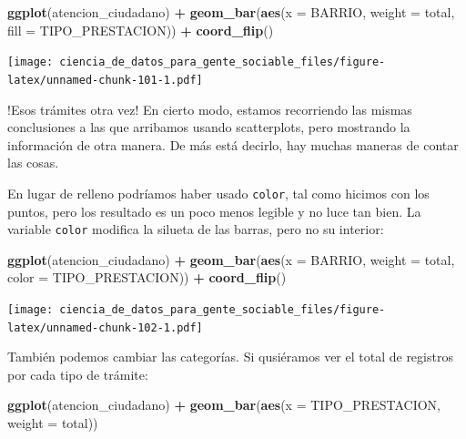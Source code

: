 \documentclass[spanish,]{book}
\newenvironment{Shaded}{\begin{snugshade}}{\end{snugshade}}
\newcommand{\DataTypeTok}[1]{\textcolor[rgb]{0.13,0.29,0.53}{#1}}
\newcommand{\KeywordTok}[1]{\textcolor[rgb]{0.13,0.29,0.53}{\textbf{#1}}}
\newcommand{\NormalTok}[1]{#1}
\newcommand{\OperatorTok}[1]{\textcolor[rgb]{0.81,0.36,0.00}{\textbf{#1}}}
\newcommand{\StringTok}[1]{\textcolor[rgb]{0.31,0.60,0.02}{#1}}
\begin{document}
\begin{Shaded}
\begin{Highlighting}[]
\KeywordTok{ggplot}\NormalTok{(atencion_ciudadano) }\OperatorTok{+}
\StringTok{    }\KeywordTok{geom_bar}\NormalTok{(}\KeywordTok{aes}\NormalTok{(}\DataTypeTok{x =}\NormalTok{ BARRIO, }\DataTypeTok{weight =}\NormalTok{ total, }\DataTypeTok{fill =}\NormalTok{ TIPO_PRESTACION)) }\OperatorTok{+}
\StringTok{    }\KeywordTok{coord_flip}\NormalTok{()}
\end{Highlighting}
\end{Shaded}

\texttt{[image: ciencia\_de\_datos\_para\_gente\_sociable\_files/figure-latex/unnamed-chunk-101-1.pdf]}

!Esos trámites otra vez! En cierto modo, estamos recorriendo las mismas conclusiones a las que arribamos usando scatterplots, pero mostrando la información de otra manera. De más está decirlo, hay muchas maneras de contar las cosas.

En lugar de relleno podríamos haber usado \texttt{color}, tal como hicimos con los puntos, pero los resultado es un poco menos legible y no luce tan bien. La variable \texttt{color} modifica la silueta de las barras, pero no su interior:

\begin{Shaded}
\begin{Highlighting}[]
\KeywordTok{ggplot}\NormalTok{(atencion_ciudadano) }\OperatorTok{+}
\StringTok{    }\KeywordTok{geom_bar}\NormalTok{(}\KeywordTok{aes}\NormalTok{(}\DataTypeTok{x =}\NormalTok{ BARRIO, }\DataTypeTok{weight =}\NormalTok{ total, }\DataTypeTok{color =}\NormalTok{ TIPO_PRESTACION)) }\OperatorTok{+}
\StringTok{    }\KeywordTok{coord_flip}\NormalTok{()}
\end{Highlighting}
\end{Shaded}

\texttt{[image: ciencia\_de\_datos\_para\_gente\_sociable\_files/figure-latex/unnamed-chunk-102-1.pdf]}

También podemos cambiar las categorías. Si qusiéramos ver el total de registros por cada tipo de trámite:

\begin{Shaded}
\begin{Highlighting}[]
\KeywordTok{ggplot}\NormalTok{(atencion_ciudadano) }\OperatorTok{+}
\StringTok{    }\KeywordTok{geom_bar}\NormalTok{(}\KeywordTok{aes}\NormalTok{(}\DataTypeTok{x =}\NormalTok{ TIPO_PRESTACION, }\DataTypeTok{weight =}\NormalTok{ total)) }
\end{Highlighting}
\end{Shaded}
\end{document}
